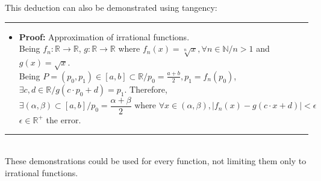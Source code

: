 \documentclass[a4paper, 11pt]{article}
\begin{document}
\begin{enumerate}
 This deduction can also be demonstrated using tangency:\\
    \rule{\linewidth}{0.4pt}
    \begin{itemize}
        \item \textbf{Proof:} Approximation of irrational functions.\\
 Being $f_n:\mathbb{R}\rightarrow\mathbb{R}$, $g:\mathbb{R}\rightarrow\mathbb{R}$ where $f_n(x) = \sqrt[n]{x}, \forall n \in \mathbb{N} / n > 1$ and $g(x) = \sqrt{x}$.\\
 Being $P=(p_0, p_1)\in[a,b]\subset \mathbb{R} / p_0 = \frac{a+b}{2}, p_1 = f_n(p_0)$, \\$\exists c,d\in\mathbb{R} / g(c\cdot p_0 + d) = p_1$.
 Therefore, 
        $$\exists (\alpha, \beta) \subset [a,b] / p_0 = \frac{\alpha + \beta}{2} \text{ where } \forall x \in (\alpha, \beta), |f_n(x) - g(c\cdot x + d)| < \epsilon$$
        $\epsilon\in\mathbb{R^+}$ the error.
    \end{itemize}
    \rule{\linewidth}{0.4pt}\\
 These demonstrations could be used for every function, not limiting them only to irrational functions.
\end{enumerate}
\end{document}
